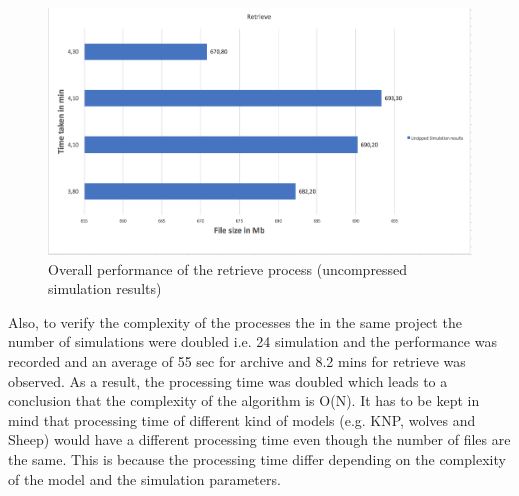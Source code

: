 \begin{figure}[H]
    \centering \includegraphics[scale=0.5]{grafiken/retrieveUnzip.png}
    \caption{Overall performance of the retrieve process (uncompressed simulation results)}
    \label{fig:restorePerformanceUn}
\end{figure}

Also, to verify the complexity of the processes the in the same project the number of simulations were doubled i.e. 24 simulation and the performance was recorded
and an average of 55 sec for archive and 8.2 mins for retrieve was observed. As a result, the processing time was doubled which leads to a
conclusion that the complexity of the algorithm is O(N). It has to be kept in mind that processing time of different kind of models (e.g. KNP, wolves and Sheep) 
would have a different processing time even though the number of files are the same. This is because the processing time differ depending on the complexity of 
the model and the simulation parameters. 